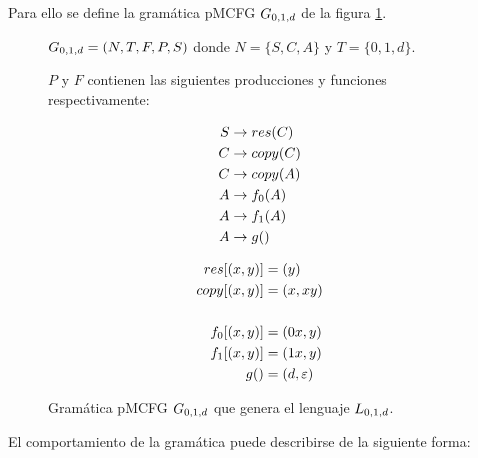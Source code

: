 Para ello se define la gramática pMCFG $G_{0, 1, d}$ de la figura \ref{fig:repeat-grammar}.

\begin{figure}[h]
    \centering
    $G_{0, 1, d} = (N, T, F, P, S)$ donde $N = \{S, C, A\}$ y $T = \{0, 1, d\}$.

    $P$ y $F$ contienen las siguientes producciones y funciones respectivamente:

    \begin{minipage}{0.45\textwidth}
        \begin{align*}
            S & \rightarrow res(C)  \\
            C & \rightarrow copy(C) \\
            C & \rightarrow copy(A) \\
            A & \rightarrow f_0(A)  \\
            A & \rightarrow f_1(A)  \\
            A & \rightarrow g()
        \end{align*}
    \end{minipage}
    \hfill
    \begin{minipage}{0.45\textwidth}
        \begin{align*}
            res[(x,y)]  & = (y)        \\
            copy[(x,y)] & = (x,xy)     \\
            \\
            f_0[(x,y)]  & = (0x,y)     \\
            f_1[(x,y)]  & = (1x,y)     \\
            g()         & = (d,\varepsilon)
        \end{align*}

    \end{minipage}

    \caption{Gramática pMCFG $G_{0, 1, d}$ que genera el lenguaje $L_{0,1,d}$.
    }
    \label{fig:repeat-grammar}

\end{figure}

El comportamiento de la gramática puede describirse de la siguiente forma:

